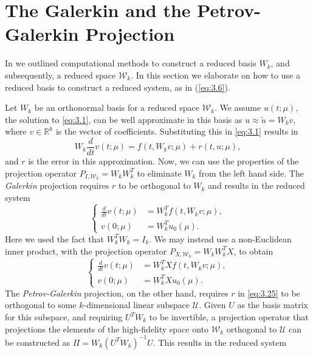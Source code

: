 \section{The Galerkin and the Petrov-Galerkin Projection} \label{sec:3.4}
In  we outlined computational methods to construct a reduced basis $W_k$, and subsequently, a reduced space $\mathcal W_k$. In this section we elaborate on how to use a reduced basis to construct a reduced system, as in (\ref{eq:3.6}).

Let $W_k$ be an orthonormal basis for a reduced space $\mathcal W_k$. We assume $u(t;\mu)$, the solution to \eqref{eq:3.1}, can be well approximate in this basis as $u \approx \tilde u = W_k v$, where $v\in \mathbb R^{k}$ is the vector of coefficients. Substituting this in 
\eqref{eq:3.1} results in
\begin{equation} \label{eq:3.25}
	W_k \frac{d}{dt} v(t;\mu) = f(t,W_kv;\mu) + r(t,u;\mu),
\end{equation}
and $r$ is the error in this approximation. Now, we can use the properties of the projection operator $P_{I,\mathcal W_k} = W_kW_k^T$ to eliminate $W_k$ from the left hand side. The \emph{Galerkin} projection requires $r$ to be orthogonal to $W_k$ and results in the reduced system
\begin{equation} \label{eq:3.26}
	\left\{
	\begin{aligned}
	\frac{d}{dt} v(t;\mu) &= W_k^T f(t,W_kv;\mu), \\
	v(0;\mu) &= W_k^T u_0(\mu).
	\end{aligned}
	\right.
\end{equation}
Here we used the fact that $W_k^TW_k = I_k$. We may instead use a non-Euclidean inner product, with the projection operator $P_{X,\mathcal W_k} = W_kW_k^TX$, to obtain
\begin{equation} \label{eq:3.27}
	\left\{
	\begin{aligned}
	\frac{d}{dt} v(t;\mu) &= W_k^T X f(t,W_kv;\mu), \\
	v(0;\mu) &= W_k^T X u_0(\mu).
	\end{aligned}
	\right.
\end{equation}
The \emph{Petrov-Galerkin} projection, on the other hand, requires $r$ in \eqref{eq:3.25} to be orthogonal to some $k$-dimensional linear subspace $\mathcal U$. Given $U$ as the basis matrix for this subspace, and requiring $U^TW_k$ to be invertible, a projection operator that projections the elements of the high-fidelity space onto $\mathcal W_k$ orthogonal to $\mathcal U$ can be constructed as $\Pi = W_k(U^T W_k)^{-1} U$. This results in the reduced system
